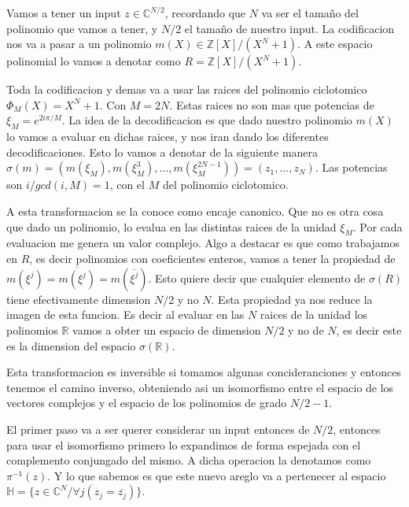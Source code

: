\documentclass[12pt, oneside]{article}
\begin{document}
Vamos a tener un input $z\in \mathbb{C}^{N/2}$, recordando que $N$ va ser el tamaño
del polinomio que vamos a tener, y $N/2$ el tamaño de nuestro input.
La codificacion nos va a pasar a un polinomio $m(X)\in \mathbb{Z}[X]/(X^N+1)$.
A este espacio polinomial lo vamos a denotar como $R= \mathbb{Z}[X]/(X^N+1)$.

Toda la codificacion y demas va a usar las raices del polinomio ciclotomico $\Phi_M(X)=
X^N+1$.
Con $M=2N$.
Estas raices no son mas que potencias de $\xi_M=e^{2i\pi/M}$.
La idea de la decodificacion es que dado nuestro polinomio $m(X)$ lo vamos a evaluar en dichas
raices, y nos iran dando los diferentes decodificaciones.
Esto lo vamos a denotar de la siguiente manera $\sigma(m) = (m(\xi_M), m(\xi_M^3),...,m(\xi_M^{2N-1}))=(z_1,...,z_N)$.
Las potencias son $i/gcd(i,M)=1$, con el $M$ del polinomio ciclotomico.


A esta transformacion se la conoce como encaje canonico.
Que no es otra cosa que dado un polinomio, lo evalua en las distintas raices de la unidad $\xi_M$.
Por cada evaluacion me genera un valor complejo.
Algo a destacar es que como trabajamos en  $R$, es decir polinomios con coeficientes enteros,
vamos a tener la propiedad de $m(\xi^j)=\overline{m(\xi^j)}=m(\overline{\xi^j})$.
Esto quiere decir que cualquier elemento de $\sigma(R)$ tiene efectivamente dimension
$N/2$ y no $N$.
Esta propiedad ya nos reduce la imagen de esta funcion.
Es decir al evaluar en las $N$ raices de la unidad los polinomios $\mathbb{R}$ vamos a
obter  un espacio de dimension $N/2$ y no de $N$, es decir este es la dimension del espacio
$\sigma(\mathbb{R})$.

Esta transformacion es inversible si tomamos algunas concideranciones y entonces tenemos el camino inverso, obteniendo asi un
isomorfismo entre el espacio de los vectores complejos y el espacio de los polinomios de grado
$N/2 -1$.


El primer paso va a ser  querer considerar un input entonces de $N/2$, entonces
para usar el isomorfismo primero lo expandimos de forma espejada con el
complemento conjungado del mismo.
A dicha operacion la denotamos como $\pi^{-1}(z)$.
Y lo que sabemos es que este nuevo areglo va a pertenecer al espacio
$\mathbb{H}=\{z\in\mathbb{C}^N/ \forall j (z_j=\overline{z_j})\}$.
\end{document}
